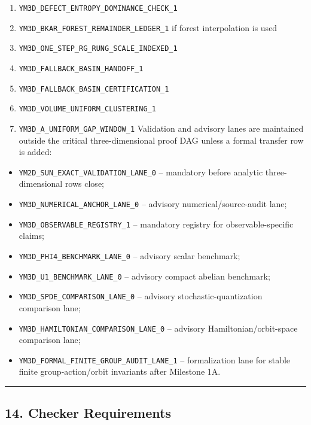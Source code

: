\documentclass[
]{article}
\providecommand{\tightlist}{%
  \setlength{\itemsep}{0pt}\setlength{\parskip}{0pt}}
\begin{document}
\begin{enumerate}
\item
  \texttt{YM3D\_DEFECT\_ENTROPY\_DOMINANCE\_CHECK\_1}
\item
  \texttt{YM3D\_BKAR\_FOREST\_REMAINDER\_LEDGER\_1} if forest
  interpolation is used
\item
  \texttt{YM3D\_ONE\_STEP\_RG\_RUNG\_SCALE\_INDEXED\_1}
\item
  \texttt{YM3D\_FALLBACK\_BASIN\_HANDOFF\_1}
\item
  \texttt{YM3D\_FALLBACK\_BASIN\_CERTIFICATION\_1}
\item
  \texttt{YM3D\_VOLUME\_UNIFORM\_CLUSTERING\_1}
\item
  \texttt{YM3D\_A\_UNIFORM\_GAP\_WINDOW\_1} Validation and advisory
  lanes are maintained outside the critical three-dimensional proof DAG
  unless a formal transfer row is added:
\end{enumerate}

\begin{itemize}
\tightlist
\item
  \texttt{YM2D\_SUN\_EXACT\_VALIDATION\_LANE\_0} -- mandatory before
  analytic three-dimensional rows close;
\item
  \texttt{YM3D\_NUMERICAL\_ANCHOR\_LANE\_0} -- advisory
  numerical/source-audit lane;
\item
  \texttt{YM3D\_OBSERVABLE\_REGISTRY\_1} -- mandatory registry for
  observable-specific claims;
\item
  \texttt{YM3D\_PHI4\_BENCHMARK\_LANE\_0} -- advisory scalar benchmark;
\item
  \texttt{YM3D\_U1\_BENCHMARK\_LANE\_0} -- advisory compact abelian
  benchmark;
\item
  \texttt{YM3D\_SPDE\_COMPARISON\_LANE\_0} -- advisory
  stochastic-quantization comparison lane;
\item
  \texttt{YM3D\_HAMILTONIAN\_COMPARISON\_LANE\_0} -- advisory
  Hamiltonian/orbit-space comparison lane;
\item
  \texttt{YM3D\_FORMAL\_FINITE\_GROUP\_AUDIT\_LANE\_1} -- formalization
  lane for stable finite group-action/orbit invariants after Milestone
  1A.
\end{itemize}

\begin{center}\rule{0.5\linewidth}{0.5pt}\end{center}

\subsection{14. Checker Requirements}\label{checker-requirements}
\end{document}
